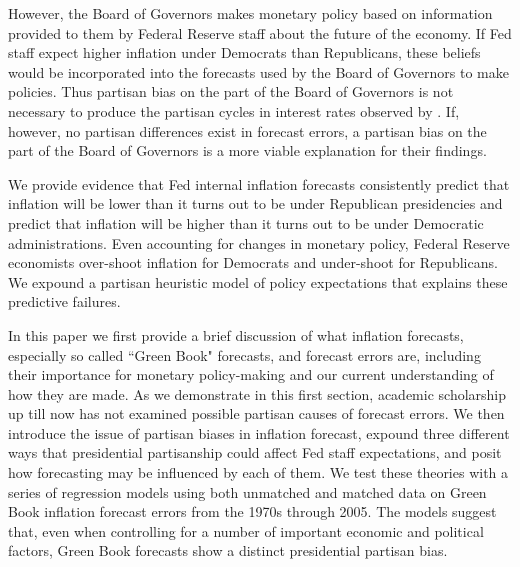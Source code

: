 \documentclass[a4paper]{article}\usepackage{graphicx, color}
\begin{document}


However, the Board of Governors makes monetary policy based on information provided to them by Federal Reserve staff about the future of the economy. If Fed staff expect higher inflation under Democrats than Republicans, these beliefs would be incorporated into the forecasts used by the Board of Governors to make policies. Thus partisan bias on the part of the Board of Governors is not necessary to produce the partisan cycles in interest rates observed by \cite{Clark2011}. If, however, no partisan differences exist in forecast errors, a partisan bias on the part of the Board of Governors is a more viable explanation for their findings.

We provide evidence that Fed internal inflation forecasts consistently predict that inflation will be lower than it turns out to be under Republican presidencies and predict that inflation will be higher than it turns out to be under Democratic administrations. Even accounting for changes in monetary policy, Federal Reserve economists over-shoot inflation for Democrats and under-shoot for Republicans. We expound a partisan heuristic model of policy expectations that explains these predictive failures.

In this paper we first provide a brief discussion of what inflation forecasts, especially so called ``Green Book" forecasts, and forecast errors are, including their importance for monetary policy-making and our current understanding of how they are made. As we demonstrate in this first section, academic scholarship up till now has not examined possible partisan causes of forecast errors. We then introduce the issue of partisan biases in inflation forecast, expound three different ways that presidential partisanship could affect Fed staff expectations, and posit how forecasting may be influenced by each of them. We test these theories with a series of regression models using both unmatched and matched data on Green Book inflation forecast errors from the 1970s through 2005. The models suggest that, even when controlling for a number of important economic and political factors, Green Book forecasts show a distinct presidential partisan bias. 
\end{document}
